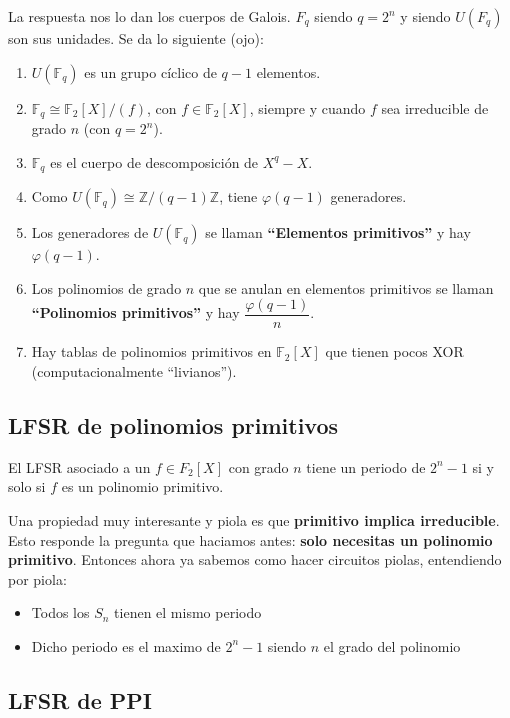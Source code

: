 \documentclass[12pt,a4paper]{report}
\begin{document}
La respuesta nos lo dan los cuerpos de Galois. $F_q$ siendo $q = 2^n$ y siendo $U(F_q)$ son sus unidades. Se da lo siguiente (ojo):
\begin{enumerate}
  \item $U(\mathbb{F}_q)$ es un grupo cíclico de $q-1$ elementos.

  \item $\mathbb{F}_q \cong \mathbb{F}_2[X]/(f)$, con $f \in \mathbb{F}_2[X]$, siempre y cuando $f$ sea irreducible de grado $n$ (con $q = 2^n$).

  \item $\mathbb{F}_q$ es el cuerpo de descomposición de $X^q - X$.

  \item Como $U(\mathbb{F}_q) \cong \mathbb{Z}/(q-1)\mathbb{Z}$, tiene $\varphi(q-1)$ generadores.

  \item Los generadores de $U(\mathbb{F}_q)$ se llaman \textbf{``Elementos primitivos''} y hay $\varphi(q-1)$.

  \item Los polinomios de grado $n$ que se anulan en elementos primitivos se llaman \textbf{``Polinomios primitivos''} y hay $\dfrac{\varphi(q-1)}{n}$.

  \item Hay tablas de polinomios primitivos en $\mathbb{F}_2[X]$ que tienen pocos XOR (computacionalmente ``livianos'').
\end{enumerate}

\subsection{LFSR de polinomios primitivos}
El LFSR asociado a un $f \in F_2[X]$ con grado $n$ tiene un periodo de $2^n-1$ si y solo si $f$ es un polinomio primitivo.

Una propiedad muy interesante y piola es que \textbf{primitivo implica irreducible}.
Esto responde la pregunta que haciamos antes: \textbf{solo necesitas un polinomio primitivo}. Entonces ahora ya sabemos como hacer circuitos piolas,  entendiendo por piola:

\begin{itemize}
\item Todos los $S_n$ tienen el mismo periodo
\item Dicho periodo es el maximo de $2^n -1$ siendo $n$ el grado del polinomio
\end{itemize}

\subsection{LFSR de PPI}
\end{document}
